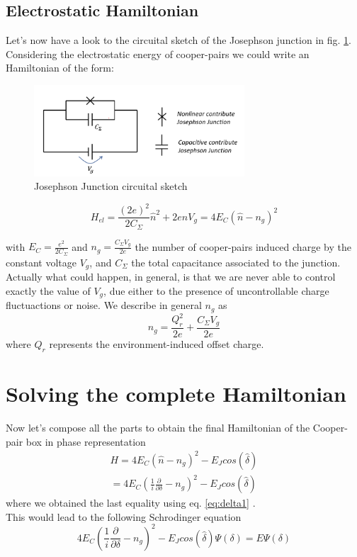 \subsection{Electrostatic Hamiltonian}
Let's now have a look to the circuital sketch of the Josephson junction in fig. \ref{fig:jj2}. Considering the electrostatic energy of cooper-pairs we could write an Hamiltonian of the form:
\begin{figure}[h]
\centering
\includegraphics[width=0.7\textwidth]{pic/transmon/jj2.png}
\caption{Josephson Junction circuital sketch}
\label{fig:jj2}
\end{figure}



$$H_{el} = \frac{(2e)^2}{2C_{\Sigma}}\hat{n}^2 + 2e\hat{n}V_g  = 4E_C(\hat{n}-n_g)^2$$
   
with $E_C = \frac{e^2}{2C_{\Sigma}}$ and $n_g = \frac{C_{\Sigma}V_g}{2e}$ the number of cooper-pairs induced charge by the constant voltage $V_g$, and $C_{\Sigma}$ the total capacitance associated to the junction.\\
Actually what could happen, in general, is that we are never able to control exactly the value of $V_g$, due either to the presence of uncontrollable charge fluctuactions or noise. We describe in general $n_g$ as
\begin{equation}
    n_g = \frac{Q_r^2}{2e} + \frac{C_{\Sigma}V_g}{2e}
\end{equation}
where $Q_r$ represents the environment-induced offset charge.


\section{Solving the complete Hamiltonian}
Now let's compose all the parts to obtain the final Hamiltonian of the Cooper-pair box in phase representation
\begin{equation}
    \label{HamiltonianJJ}
    \begin{split}
    H = 4E_C(\hat{n}-n_g)^2 -E_Jcos(\hat{\delta}) \\= 4E_C(\frac{1}{i}\frac{\partial}{\partial\delta}-n_g)^2 -E_Jcos(\hat{\delta})
    \end{split}
\end{equation}
where we obtained the last equality using eq. \ref{eq:delta1} .\\
This would lead to the following Schrodinger equation
\begin{equation}
    4E_C(\frac{1}{i}\frac{\partial}{\partial\delta}-n_g)^2 -E_Jcos(\hat{\delta})\Psi(\delta) = E\Psi(\delta)
\end{equation}

